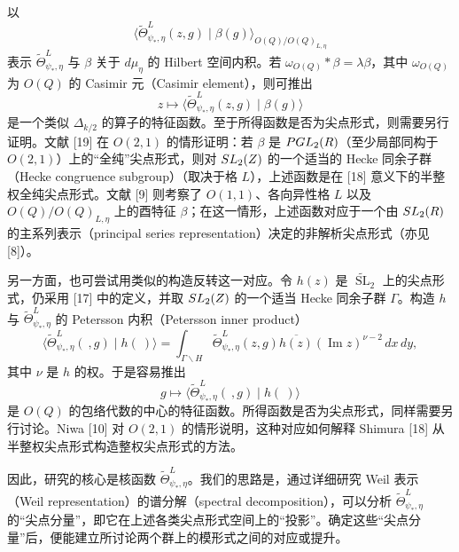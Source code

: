 以
\[
 \langle\widetilde\Theta_{\psi_*,\eta}^L(z,g)\mid\beta(g)\rangle_{O(Q)/O(Q)_{L,\eta}}
\]
表示 $\widetilde\Theta_{\psi_*,\eta}^L$ 与 $\beta$ 关于 $d\mu_\eta$ 的 Hilbert 空间内积。若 $\omega_{O(Q)}*\beta=\lambda\beta$，其中 $\omega_{O(Q)}$ 为 $O(Q)$ 的 Casimir 元（Casimir element），则可推出
\[
 z\longmapsto\langle\widetilde\Theta_{\psi_*,\eta}^L(z,g)\mid\beta(g)\rangle
\]
是一个类似 $\Delta_{k/2}$ 的算子的特征函数。至于所得函数是否为尖点形式，则需要另行证明。文献 [19] 在 $O(2,1)$ 的情形证明：若 $\beta$ 是 $PGL_2(R)$（至少局部同构于 $O(2,1)$）上的“全纯”尖点形式，则对 $SL_2(Z)$ 的一个适当的 Hecke 同余子群（Hecke congruence subgroup）（取决于格 $L$），上述函数是在 [18] 意义下的半整权全纯尖点形式。文献 [9] 则考察了 $O(1,1)$、各向异性格 $L$ 以及 $O(Q)/O(Q)_{L,\eta}$ 上的酉特征 $\beta$；在这一情形，上述函数对应于一个由 $SL_2(R)$ 的主系列表示（principal series representation）决定的非解析尖点形式（亦见 [8]）。

另一方面，也可尝试用类似的构造反转这一对应。令 $h(z)$ 是 $\widetilde{\operatorname{SL}}_2$ 上的尖点形式，仍采用 [17] 中的定义，并取 $SL_2(Z)$ 的一个适当 Hecke 同余子群 $\Gamma$。构造 $h$ 与 $\widetilde\Theta_{\psi_*,\eta}^L$ 的 Petersson 内积（Petersson inner product）
\begin{equation}
 \langle\widetilde\Theta_{\psi_*,\eta}^L(\ ,g)\mid h(\ )\rangle
 =\int_{\Gamma\backslash H}\widetilde\Theta_{\psi_*,\eta}^L(z,g)
 \overline{h(z)}(\operatorname{Im}z)^{\nu-2}\,dx\,dy,\tag{1-8}
\end{equation}
其中 $\nu$ 是 $h$ 的权。于是容易推出
\[
 g\longmapsto\langle\widetilde\Theta_{\psi_*,\eta}^L(\ ,g)\mid h(\ )\rangle
\]
是 $O(Q)$ 的包络代数的中心的特征函数。所得函数是否为尖点形式，同样需要另行讨论。Niwa [10] 对 $O(2,1)$ 的情形说明，这种对应如何解释 Shimura [18] 从半整权尖点形式构造整权尖点形式的方法。

因此，研究的核心是核函数 $\widetilde\Theta_{\psi_*,\eta}^L$。我们的思路是，通过详细研究 Weil 表示（Weil representation）的谱分解（spectral decomposition），可以分析 $\widetilde\Theta_{\psi_*,\eta}^L$ 的“尖点分量”，即它在上述各类尖点形式空间上的“投影”。确定这些“尖点分量”后，便能建立所讨论两个群上的模形式之间的对应或提升。

